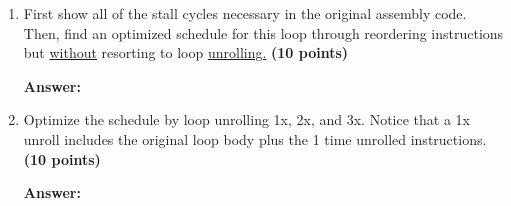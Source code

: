 \documentclass[a4paper, 11pt]{exam}
\begin{document}
\begin{center}
\begin{enumerate}
\begin{enumerate}
	\item First show all of the stall cycles necessary in the original assembly code. Then, find an optimized schedule for this loop through reordering instructions but \underline{without} resorting to loop \underline{unrolling.} \textbf{(10 points)}
	
	\hfill
 
\textbf{Answer:} 

\hfill
	
	\item Optimize the schedule by loop unrolling 1x, 2x, and 3x. Notice that a 1x unroll includes the original loop body plus the 1 time unrolled instructions. \textbf{(10 points)}
	
	\hfill
 
\textbf{Answer:} 

\hfill


\end{enumerate}




\end{enumerate}
\end{center}
\end{document}
